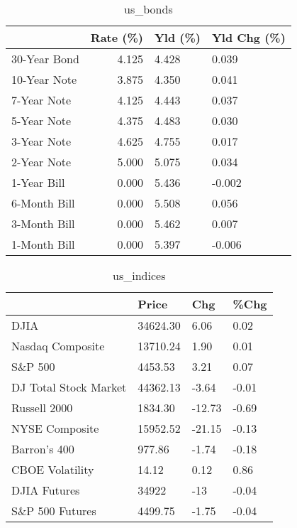 \documentclass{article}%
\begin{document}
%


\begin{table}[htbp]%
\caption{us\_bonds}%
\centering%
\begin{adjustbox}{width=1\textwidth}%
\begin{tabular}{lrll}
\toprule
             &  Rate (\%) & Yld (\%) & Yld Chg (\%) \\
\midrule
30-Year Bond &     4.125 &   4.428 &       0.039 \\
10-Year Note &     3.875 &   4.350 &       0.041 \\
 7-Year Note &     4.125 &   4.443 &       0.037 \\
 5-Year Note &     4.375 &   4.483 &       0.030 \\
 3-Year Note &     4.625 &   4.755 &       0.017 \\
 2-Year Note &     5.000 &   5.075 &       0.034 \\
 1-Year Bill &     0.000 &   5.436 &      -0.002 \\
6-Month Bill &     0.000 &   5.508 &       0.056 \\
3-Month Bill &     0.000 &   5.462 &       0.007 \\
1-Month Bill &     0.000 &   5.397 &      -0.006 \\
\bottomrule
\end{tabular}
%
\end{adjustbox}%
\end{table}

%


\begin{table}[htbp]%
\caption{us\_indices}%
\centering%
\begin{adjustbox}{width=1\textwidth}%
\begin{tabular}{llll}
\toprule
                      &    Price &    Chg &  \%Chg \\
\midrule
                 DJIA & 34624.30 &   6.06 &  0.02 \\
     Nasdaq Composite & 13710.24 &   1.90 &  0.01 \\
              S\&P 500 &  4453.53 &   3.21 &  0.07 \\
DJ Total Stock Market & 44362.13 &  -3.64 & -0.01 \\
         Russell 2000 &  1834.30 & -12.73 & -0.69 \\
       NYSE Composite & 15952.52 & -21.15 & -0.13 \\
         Barron's 400 &   977.86 &  -1.74 & -0.18 \\
      CBOE Volatility &    14.12 &   0.12 &  0.86 \\
         DJIA Futures &    34922 &    -13 & -0.04 \\
      S\&P 500 Futures &  4499.75 &  -1.75 & -0.04 \\
\bottomrule
\end{tabular}
%
\end{adjustbox}%
\end{table}
\end{document}
